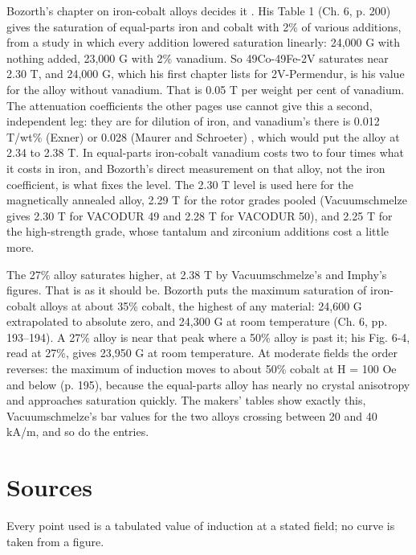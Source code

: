 \documentclass[
  11pt,
]{article}
\begin{document}
Bozorth's chapter on iron-cobalt alloys decides it \cite{bozorth1951}. His Table 1 (Ch. 6, p. 200) gives the saturation of equal-parts iron and cobalt with 2\% of various additions, from a study in which every addition lowered saturation linearly: 24,000 G with nothing added, 23,000 G with 2\% vanadium. So 49Co-49Fe-2V saturates near 2.30 T, and 24,000 G, which his first chapter lists for 2V-Permendur, is his value for the alloy without vanadium. That is 0.05 T per weight per cent of vanadium. The attenuation coefficients the other pages use cannot give this a second, independent leg: they are for dilution of iron, and vanadium's there is 0.012 T/wt\% (Exner) or 0.028 (Maurer and Schroeter) \cite{ouda}, which would put the alloy at 2.34 to 2.38 T. In equal-parts iron-cobalt vanadium costs two to four times what it costs in iron, and Bozorth's direct measurement on that alloy, not the iron coefficient, is what fixes the level. The 2.30 T level is used here for the magnetically annealed alloy, 2.29 T for the rotor grades pooled (Vacuumschmelze gives 2.30 T for VACODUR 49 and 2.28 T for VACODUR 50), and 2.25 T for the high-strength grade, whose tantalum and zirconium additions cost a little more.

The 27\% alloy saturates higher, at 2.38 T by Vacuumschmelze's and Imphy's figures. That is as it should be. Bozorth puts the maximum saturation of iron-cobalt alloys at about 35\% cobalt, the highest of any material: 24,600 G extrapolated to absolute zero, and 24,300 G at room temperature (Ch. 6, pp. 193--194). A 27\% alloy is near that peak where a 50\% alloy is past it; his Fig. 6-4, read at 27\%, gives 23,950 G at room temperature. At moderate fields the order reverses: the maximum of induction moves to about 50\% cobalt at H = 100 Oe and below (p. 195), because the equal-parts alloy has nearly no crystal anisotropy and approaches saturation quickly. The makers' tables show exactly this, Vacuumschmelze's bar values for the two alloys crossing between 20 and 40 kA/m, and so do the entries.

\section{Sources}\label{sources}

Every point used is a tabulated value of induction at a stated field; no curve is taken from a figure.
\end{document}
